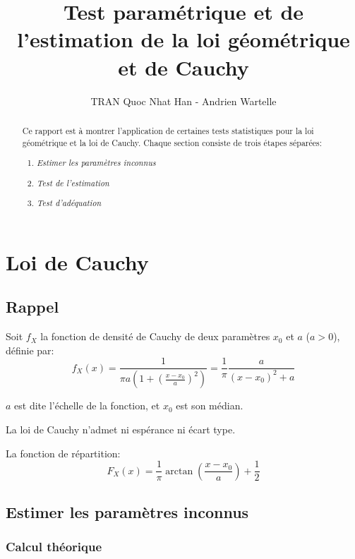 \documentclass[12pt,a4paper,titlepage]{article}
\author{TRAN Quoc Nhat Han - Andrien Wartelle}
\title{Test paramétrique et de l'estimation de la loi géométrique et de Cauchy}
\numberwithin{equation}{section}
\begin{document}
\maketitle 
\renewcommand{\contentsname}{Sommaire}
\tableofcontents

\clearpage

\begin{abstract}
Ce rapport est à montrer l'application de certaines tests statistiques pour la loi géométrique et la loi de Cauchy. Chaque section consiste de trois étapes séparées:
\begin{enumerate}
\item \emph{Estimer les paramètres inconnus}
\item \emph{Test de l'estimation}
\item \emph{Test d'adéquation}
\end{enumerate}
\end{abstract}

\section{Loi de Cauchy}
\subsection{Rappel}
Soit $f_X$ la fonction de densité de Cauchy de deux paramètres $x_0$ et $a$ ($a>0$), définie par:
\begin{equation}
\label{dCauchy}
{f_X}\left( x \right) = \frac{1}{{\pi a\left( {1 + {{\left( {\frac{{x - {x_0}}}{a}} \right)}^2}} \right)}} = \frac{1}{\pi }\frac{a}{{{{\left( {x - {x_0}} \right)}^2} + a}}
\end{equation}

$a$ est dite l'échelle de la fonction, et $x_0$ est son médian.

La loi de Cauchy n'admet ni espérance ni écart type.

La fonction de répartition:
\begin{equation}
\label{rCauchy}
{F_X}\left( x \right) = \frac{1}{\pi }\arctan \left( {\frac{{x - {x_0}}}{a}} \right) + \frac{1}{2}
\end{equation}

\subsection{Estimer les paramètres inconnus}

\subsubsection*{Calcul théorique}
\end{document}

